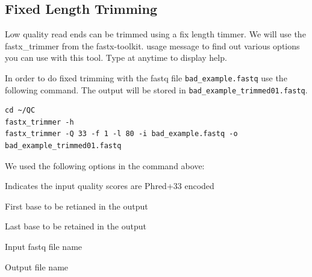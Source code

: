 \subsection{Fixed Length Trimming}
Low quality read ends can be trimmed using a fix length timmer. We will use the
fastx\_trimmer from the fastx-toolkit. usage message to find out various options
you can use with this tool. Type  at anytime to display help.

\begin{steps}
In order to do fixed trimming with the fastq file \texttt{bad\_example.fastq}
use the following command. The output will be stored in
\texttt{bad\_example\_trimmed01.fastq}.

\begin{lstlisting}
cd ~/QC
fastx_trimmer -h
fastx_trimmer -Q 33 -f 1 -l 80 -i bad_example.fastq -o bad_example_trimmed01.fastq
\end{lstlisting}
\end{steps}

\begin{note}
We used the following options in the command above:
\begin{description}[style=multiline,labelindent=0cm,align=right,leftmargin=5cm,font=\ttfamily]
 \item[-Q 33] Indicates the input quality scores are Phred+33 encoded
 \item[-f] First base to be retianed in the output
 \item[-l] Last base to be retained in the output
 \item[-i] Input fastq file name
 \item[-o] Output file name
\end{description}
\end{note}

